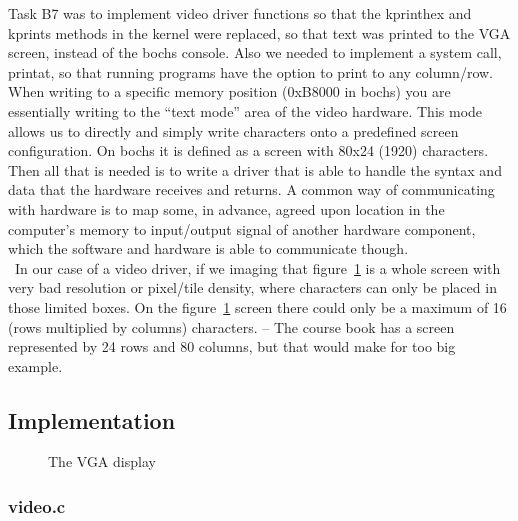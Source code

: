 Task B7 was to implement video driver functions so that the kprinthex and kprints methods in the kernel were replaced, so that text was printed to the VGA screen, instead of the bochs console. Also we needed to implement a system call, printat, so that running programs have the option to print to any column/row. When writing to a specific memory position (0xB8000 in bochs) you are essentially writing to the ``text mode'' area of the video hardware. This mode allows us to directly and simply write characters onto a predefined screen configuration. On bochs it is defined as a screen with 80x24 (1920) characters. Then all that is needed is to write a driver that is able to handle the syntax and data that the hardware receives and returns. A common way of communicating with hardware is to map some, in advance, agreed upon location in the computer's memory to input/output signal of another hardware component, which the software and hardware is able to communicate though.\
\\\
In our case of a video driver, if we imaging that figure~\ref{fig:display} is a whole screen with very bad resolution or pixel/tile density, where characters can only be placed in those limited boxes. On the figure~\ref{fig:display} screen there could only be a maximum of 16 (rows multiplied by columns) characters. – The course book\cite{TanenbaumWoodhull08} has a screen represented by 24 rows and 80 columns, but that would make for too big example.
\subsection{Implementation}

\begin{figure}
\centering
{}
\caption{The VGA display}
\label{fig:display}
\end{figure}


\subsubsection*{video.c}


